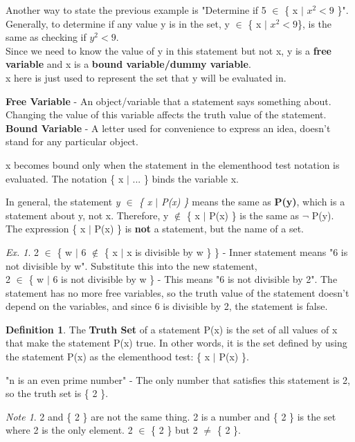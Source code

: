\documentclass[11pt]{article}
\theoremstyle{definition}
\newtheorem{defn}{Definition}
\theoremstyle{remark}
\newtheorem{exer}{Ex.}
\newtheorem{note}{Note}
\begin{document}
Another way to state the previous example is "Determine if 5 $\in$ \{ x $|$ $x^2 <9$ \}".\newline
Generally, to determine if any value y is in the set,  y $\in$ \{ x $|$ $x^2 < 9$\}, is the same as checking if $y^2 < 9$. \\
Since we need to know the value of y in this statement but not x, y is a \textbf{free variable} and x is a \textbf{bound variable/dummy variable}.\\
x here is just used to represent the set that y will be evaluated in.
\begin{shaded}
\textbf{Free Variable} - An object/variable that a statement says something about. Changing the value of this variable affects the truth value of the statement.\\
\textbf{Bound Variable} - A letter used for convenience to express an idea, doesn't stand for any particular object.
\end{shaded}

x becomes bound only when the statement in the elementhood test notation is evaluated. The notation \{ x $|$ ... \} binds the variable x.

In general, the statement \textit{y $\in$ \{ x $|$ P(x) \}} means the same as \textbf{P(y)}, which is a statement about y, not x.
Therefore, y $\notin$ \{ x $|$ P(x) \} is the same as $\neg$ P(y).\\
The expression \{ x $|$ P(x) \} is \textbf{not} a statement, but the name of a set.
\begin{exer}
2 $\in$ \{ w $|$ 6 $\notin$ \{ x $|$ x is divisible by w \} \} - Inner statement means "6 is not divisible by w". Substitute this into the new statement,\\
2 $\in$ \{ w $|$ 6 is not divisible by w \} - This means "6 is not divisible by 2". The statement has no more free variables, so the truth value of the statement doesn't depend on the variables,
and since 6 is divisible by 2, the statement is false.
\end{exer}

\begin{shaded}
\begin{defn}
The \textbf{Truth Set} of a statement P(x) is the set of all values of x that make the statement P(x) true. In other words,
it is the set defined by using the statement P(x) as the elementhood test: \{ x $|$ P(x) \}. 
\end{defn}
\end{shaded}

"n is an even prime number" - The only number that satisfies this statement is 2, so the truth set is \{ 2 \}.
\begin{note}
2 and \{ 2 \} are not the same thing. 2 is a number and \{ 2 \} is the set where 2 is the only element. 2 $\in$ \{ 2 \}
but 2 $\neq$ \{ 2 \}.
\end{note}
\end{document}
